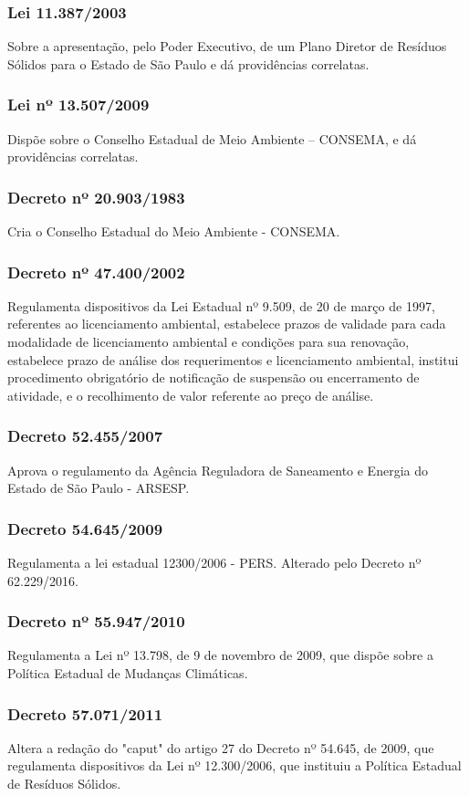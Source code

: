 \begin{subapend}
\begin{subsubapend}
		\subsubsection{Lei 11.387/2003}
		Sobre a apresentação, pelo Poder Executivo, de um Plano Diretor de Resíduos Sólidos para o Estado de São Paulo e dá providências correlatas.
		\subsubsection{Lei nº 13.507/2009}
		Dispõe sobre o Conselho Estadual de Meio Ambiente – CONSEMA, e dá providências correlatas.
		\subsubsection{Decreto nº 20.903/1983}
		Cria o Conselho Estadual do Meio Ambiente - CONSEMA.
		\subsubsection{Decreto nº 47.400/2002}
		Regulamenta dispositivos da Lei Estadual nº 9.509, de 20 de março de 1997, referentes ao licenciamento ambiental, estabelece prazos de validade para cada modalidade de licenciamento ambiental e condições para sua renovação, estabelece prazo de análise dos requerimentos e licenciamento ambiental, institui procedimento obrigatório de notificação de suspensão ou encerramento de atividade, e o recolhimento de valor referente ao preço de análise.
		\subsubsection{Decreto 52.455/2007}
		Aprova o regulamento da Agência Reguladora de Saneamento e Energia do Estado de São Paulo - ARSESP.
		\subsubsection{Decreto 54.645/2009}
		Regulamenta a lei estadual 12300/2006 - PERS. Alterado pelo Decreto nº 62.229/2016.
		\subsubsection{Decreto nº 55.947/2010}
		Regulamenta a Lei nº 13.798, de 9 de novembro de 2009, que dispõe sobre a Política Estadual de Mudanças Climáticas.
		\subsubsection{Decreto 57.071/2011}
		Altera a redação do "caput" do artigo 27 do Decreto nº 54.645, de 2009, que regulamenta dispositivos da Lei nº 12.300/2006, que instituiu a Política Estadual de Resíduos Sólidos.

\end{subsubapend}
\end{subapend}
